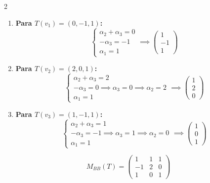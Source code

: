 \documentclass[10pt]{extarticle}
\newenvironment{term}
  {\begin{minipage}{\linewidth}}
  {\end{minipage}\par}
\begin{document}
\begin{multicols}{2}
\begin{term}
\begin{enumerate}
\item \textbf{Para $T(v_1) = (0, -1, 1)$:}
$$\begin{cases} \alpha_2 + \alpha_3 = 0 \\ -\alpha_3 = -1 \\ \alpha_1 = 1 \end{cases} \implies \begin{pmatrix} 1 \\ -1 \\ 1 \end{pmatrix}$$

\item \textbf{Para $T(v_2) = (2, 0, 1)$:}
$$\begin{cases} \alpha_2 + \alpha_3 = 2 \\ -\alpha_3 = 0 \implies \alpha_3 = 0 \implies \alpha_2 = 2 \\ \alpha_1 = 1 \end{cases} \implies \begin{pmatrix} 1 \\ 2 \\ 0 \end{pmatrix}$$

\item \textbf{Para $T(v_3) = (1, -1, 1)$:}
$$\begin{cases} \alpha_2 + \alpha_3 = 1 \\ -\alpha_3 = -1 \implies \alpha_3 = 1 \implies \alpha_2 = 0 \\ \alpha_1 = 1 \end{cases} \implies \begin{pmatrix} 1 \\ 0 \\ 1 \end{pmatrix}$$
\end{enumerate}

$$M_{BB}(T) = \begin{pmatrix} 1 & 1 & 1 \\ -1 & 2 & 0 \\ 1 & 0 & 1 \end{pmatrix}$$
\end{term}

\end{multicols}

\newpage
\end{document}
